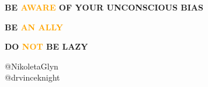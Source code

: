 \documentclass{beamer}
\begin{document}
\begin{frame}
    \centering
    \LARGE \textbf{BE \textcolor{orange}{AWARE} OF YOUR UNCONSCIOUS BIAS}
\end{frame}

\begin{frame}
    \centering
    \LARGE \textbf{BE \textcolor{orange}{AN ALLY}}
\end{frame}

\begin{frame}
    \centering
    \LARGE \textbf{DO \textcolor{orange}{NOT} BE LAZY}
\end{frame}

\begin{frame}
    @NikoletaGlyn \\
    @drvinceknight
\end{frame}
\end{document}
